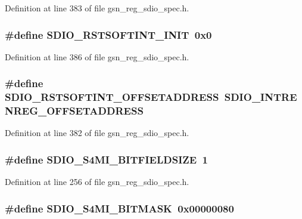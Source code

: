 Definition at line 383 of file gsn\_\-reg\_\-sdio\_\-spec.h.

\hypertarget{a00571_aa1744d98c176df7b2d15fd9cf8220ec8}{
\subsubsection[{SDIO\_\-RSTSOFTINT\_\-INIT}]{\setlength{\rightskip}{0pt plus 5cm}\#define SDIO\_\-RSTSOFTINT\_\-INIT~0x0}}
\label{a00571_aa1744d98c176df7b2d15fd9cf8220ec8}


Definition at line 386 of file gsn\_\-reg\_\-sdio\_\-spec.h.

\hypertarget{a00571_a3e27778bd9ffdbb8a1b6d7119192afca}{
\subsubsection[{SDIO\_\-RSTSOFTINT\_\-OFFSETADDRESS}]{\setlength{\rightskip}{0pt plus 5cm}\#define SDIO\_\-RSTSOFTINT\_\-OFFSETADDRESS~SDIO\_\-INTRENREG\_\-OFFSETADDRESS}}
\label{a00571_a3e27778bd9ffdbb8a1b6d7119192afca}


Definition at line 382 of file gsn\_\-reg\_\-sdio\_\-spec.h.

\hypertarget{a00571_adc218673caa0376c82da57dfec868705}{
\subsubsection[{SDIO\_\-S4MI\_\-BITFIELDSIZE}]{\setlength{\rightskip}{0pt plus 5cm}\#define SDIO\_\-S4MI\_\-BITFIELDSIZE~1}}
\label{a00571_adc218673caa0376c82da57dfec868705}


Definition at line 256 of file gsn\_\-reg\_\-sdio\_\-spec.h.

\hypertarget{a00571_a8fa4e455012dd3fd1eb37433141e6fb8}{
\subsubsection[{SDIO\_\-S4MI\_\-BITMASK}]{\setlength{\rightskip}{0pt plus 5cm}\#define SDIO\_\-S4MI\_\-BITMASK~0x00000080}}
\label{a00571_a8fa4e455012dd3fd1eb37433141e6fb8}


